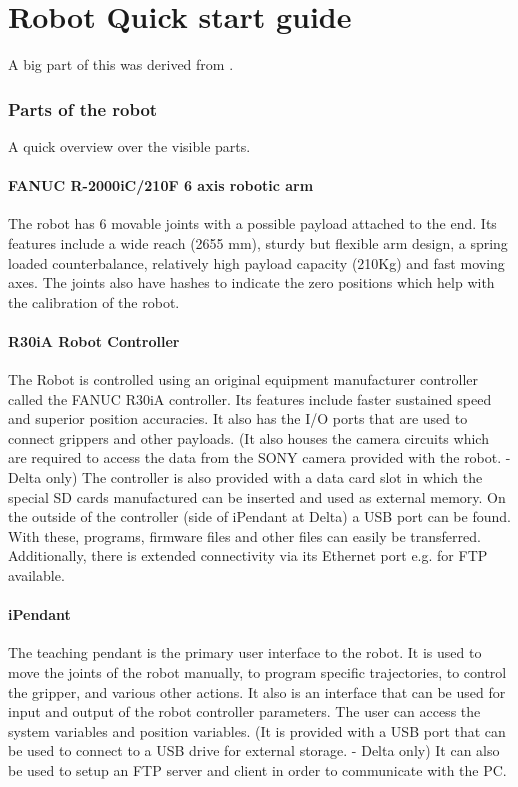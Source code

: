 \chapter{Robot Quick start guide}
A big part of this was derived from \cite{MatlabControl}.

\subsection{Parts of the robot}
A quick overview over the visible parts.

\subsubsection{FANUC R-2000iC/210F 6 axis robotic arm}
The robot has 6 movable joints with a possible payload attached to the end. Its features include a wide reach (2655 mm), sturdy but flexible arm design, a spring loaded counterbalance, relatively high payload capacity (210Kg) and fast moving axes. The joints also have hashes to indicate the zero positions which help with the calibration of the robot. 

\subsubsection{R30iA Robot Controller }
The Robot is controlled using an original equipment manufacturer controller called the FANUC R30iA controller. Its features include faster sustained speed and superior position accuracies. It also has the I/O ports that are used to connect grippers and other payloads. (It also houses the camera circuits which are required to access the data from the SONY camera provided with the robot. - Delta only)  The controller is also provided with a data card slot in which the special SD cards manufactured can be inserted and used as external memory. On the outside of the controller (side of iPendant at Delta) a USB port can be found. With these, programs, firmware files and other files can easily be transferred. Additionally, there is extended connectivity via its Ethernet port e.g. for FTP available.

\subsubsection{iPendant}
The teaching pendant is the primary user interface to the robot. It is used to move the joints of the robot manually, to program specific trajectories, to control the gripper, and various other actions. It also is an interface that can be used for input and output of the robot controller parameters. The user can access the system variables and position variables. (It is provided with a USB port that can be used to connect to a USB drive for external storage. - Delta only) It can also be used to setup an FTP server and client in order to communicate with the PC. 


